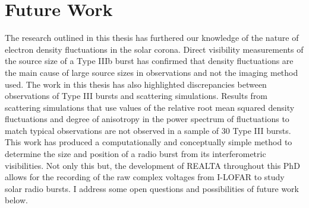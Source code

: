 \section{Future Work}
The research outlined in this thesis has furthered our knowledge of the nature of electron density fluctuations in the solar corona. Direct visibility measurements of the source size of a Type IIIb burst has confirmed that density fluctuations are the main cause of large source sizes in observations and not the imaging method used. The work in this thesis has also highlighted discrepancies between observations of Type III bursts and scattering simulations. Results from scattering simulations that use values of the relative root mean squared density fluctuations and degree of anisotropy in the power spectrum of fluctuations to match typical observations \citep[e.g.][]{Kontar2017} are not observed in a sample of 30 Type III bursts.
This work has produced a computationally and conceptually simple method to determine the size and position of a radio burst from its interferometric visibilities. Not only this but, the development of REALTA throughout this PhD allows for the recording of the raw complex voltages from I-LOFAR to study solar radio bursts. I address some open questions and possibilities of future work below.
 

